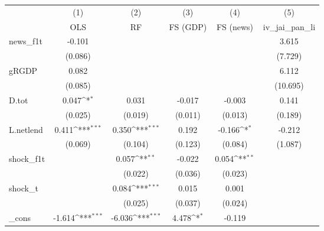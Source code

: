 {
\def\sym#1{\ifmmode^{#1}\else\(^{#1}\)\fi}
\begin{tabular}{l*{5}{c}}
\toprule
            &\multicolumn{1}{c}{(1)}&\multicolumn{1}{c}{(2)}&\multicolumn{1}{c}{(3)}&\multicolumn{1}{c}{(4)}&\multicolumn{1}{c}{(5)}\\
            &\multicolumn{1}{c}{OLS}&\multicolumn{1}{c}{RF}&\multicolumn{1}{c}{FS (GDP)}&\multicolumn{1}{c}{FS (news)}&\multicolumn{1}{c}{iv\_jai\_pan\_li}\\
\midrule
news\_f1t    &      -0.101         &                     &                     &                     &       3.615         \\
            &     (0.086)         &                     &                     &                     &     (7.729)         \\
\addlinespace
gRGDP       &       0.082         &                     &                     &                     &       6.112         \\
            &     (0.085)         &                     &                     &                     &    (10.695)         \\
\addlinespace
D.tot       &       0.047\sym{*}  &       0.031         &      -0.017         &      -0.003         &       0.141         \\
            &     (0.025)         &     (0.019)         &     (0.011)         &     (0.013)         &     (0.189)         \\
\addlinespace
L.netlend   &       0.411\sym{***}&       0.350\sym{***}&       0.192         &      -0.166\sym{*}  &      -0.212         \\
            &     (0.069)         &     (0.104)         &     (0.123)         &     (0.084)         &     (1.087)         \\
\addlinespace
shock\_f1t   &                     &       0.057\sym{**} &      -0.022         &       0.054\sym{**} &                     \\
            &                     &     (0.022)         &     (0.036)         &     (0.023)         &                     \\
\addlinespace
shock\_t     &                     &       0.084\sym{***}&       0.015         &       0.001         &                     \\
            &                     &     (0.025)         &     (0.037)         &     (0.024)         &                     \\
\addlinespace
\_cons      &      -1.614\sym{***}&      -6.036\sym{***}&       4.478\sym{*}  &      -0.119         &                     \\

\end{tabular}}
